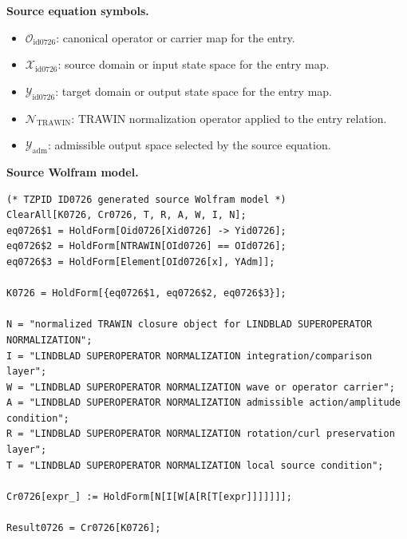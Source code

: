 \begin{minipage}[t]{0.49\linewidth}
\begingroup
\small
\raggedright
\textbf{Source equation symbols.}\par
\begin{itemize}[leftmargin=1.35em,itemsep=1pt,topsep=1pt,parsep=0pt]
    \item $\mathcal{O}_{\mathrm{id0726}}$: canonical operator or carrier map for the entry.
    \item $\mathcal{X}_{\mathrm{id0726}}$: source domain or input state space for the entry map.
    \item $\mathcal{Y}_{\mathrm{id0726}}$: target domain or output state space for the entry map.
    \item $\mathcal{N}_{\mathrm{TRAWIN}}$: TRAWIN normalization operator applied to the entry relation.
    \item $\mathcal{Y}_{\mathrm{adm}}$: admissible output space selected by the source equation.
\end{itemize}
\endgroup
\end{minipage}\hfill
\begin{minipage}[t]{0.47\linewidth}
\begingroup
\scriptsize
\raggedright
\textbf{Source Wolfram model.}\par
\begin{Verbatim}[fontsize=\tiny,breaklines=true,breakanywhere=true]
(* TZPID ID0726 generated source Wolfram model *)
ClearAll[K0726, Cr0726, T, R, A, W, I, N];
eq0726$1 = HoldForm[Oid0726[Xid0726] -> Yid0726];
eq0726$2 = HoldForm[NTRAWIN[OId0726] == OId0726];
eq0726$3 = HoldForm[Element[OId0726[x], YAdm]];

K0726 = HoldForm[{eq0726$1, eq0726$2, eq0726$3}];

N = "normalized TRAWIN closure object for LINDBLAD SUPEROPERATOR NORMALIZATION";
I = "LINDBLAD SUPEROPERATOR NORMALIZATION integration/comparison layer";
W = "LINDBLAD SUPEROPERATOR NORMALIZATION wave or operator carrier";
A = "LINDBLAD SUPEROPERATOR NORMALIZATION admissible action/amplitude condition";
R = "LINDBLAD SUPEROPERATOR NORMALIZATION rotation/curl preservation layer";
T = "LINDBLAD SUPEROPERATOR NORMALIZATION local source condition";

Cr0726[expr_] := HoldForm[N[I[W[A[R[T[expr]]]]]]];

Result0726 = Cr0726[K0726];
\end{Verbatim}
\endgroup
\end{minipage}

